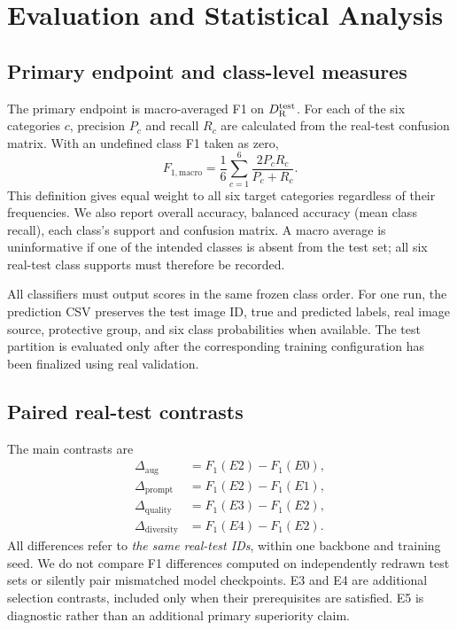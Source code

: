 \section{Evaluation and Statistical Analysis}
\subsection{Primary endpoint and class-level measures}
The primary endpoint is macro-averaged F1 on $D_{\mathrm{R}}^{\mathrm{test}}$. For each of the six categories $c$, precision $P_c$ and recall $R_c$ are calculated from the real-test confusion matrix. With an undefined class F1 taken as zero,
\begin{equation}
F_{1,\mathrm{macro}} =
\frac{1}{6}\sum_{c=1}^{6}
\frac{2P_cR_c}{P_c+R_c}.
\label{eq:f1}
\end{equation}
This definition gives equal weight to all six target categories regardless of their frequencies. We also report overall accuracy, balanced accuracy (mean class recall), each class's support and confusion matrix. A macro average is uninformative if one of the intended classes is absent from the test set; all six real-test class supports must therefore be recorded.

All classifiers must output scores in the same frozen class order. For one run, the prediction CSV preserves the test image ID, true and predicted labels, real image source, protective group, and six class probabilities when available. The test partition is evaluated only after the corresponding training configuration has been finalized using real validation.

\subsection{Paired real-test contrasts}
The main contrasts are
\begin{align}
\Delta_{\mathrm{aug}}&=F_1(E2)-F_1(E0),\\
\Delta_{\mathrm{prompt}}&=F_1(E2)-F_1(E1),\\
\Delta_{\mathrm{quality}}&=F_1(E3)-F_1(E2),\\
\Delta_{\mathrm{diversity}}&=F_1(E4)-F_1(E2).
\label{eq:contrasts}
\end{align}
All differences refer to \emph{the same real-test IDs}, within one backbone and training seed. We do not compare F1 differences computed on independently redrawn test sets or silently pair mismatched model checkpoints. E3 and E4 are additional selection contrasts, included only when their prerequisites are satisfied. E5 is diagnostic rather than an additional primary superiority claim.


